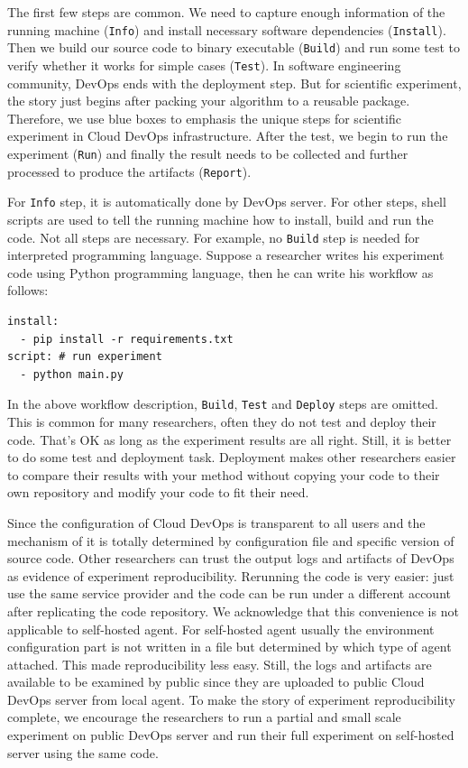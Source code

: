 \documentclass[10pt, conference, compsocconf]{IEEEtran}
\begin{document}
The first few steps are common. We need to capture enough information of the running machine (\texttt{Info}) and install necessary software dependencies (\texttt{Install}). Then we build our source code to binary executable (\texttt{Build}) and run some test to verify whether it works for simple cases (\texttt{Test}). In software engineering community, DevOps ends with the deployment step. But for scientific experiment, the story just begins after packing your algorithm to a reusable package. Therefore, we use blue boxes to emphasis the unique steps for scientific experiment in Cloud DevOps infrastructure. After the test, we begin to run the experiment (\texttt{Run}) and finally the result needs to be collected and further processed to produce the artifacts (\texttt{Report}).

For \texttt{Info} step, it is automatically done by DevOps server. For other steps, shell scripts are used to tell the running machine how to install, build and run the code. Not all steps are necessary. For example, no \texttt{Build} step is needed for interpreted programming language. Suppose a researcher writes his experiment code using Python programming language, then he can write his workflow as follows:
\begin{lstlisting}[caption={workflow description}, label={lst:wd}, basicstyle={\small}]
install: 
  - pip install -r requirements.txt
script: # run experiment
  - python main.py
\end{lstlisting}

In the above workflow description, \texttt{Build}, \texttt{Test} and \texttt{Deploy} steps are omitted. This is common for many researchers, often they do not test and deploy their code. That's OK as long as the experiment results are all right. Still, it is better to do some test and deployment task. Deployment makes other researchers easier to compare their results with your method without copying your code to their own repository and modify your code to fit their need.

Since the configuration of Cloud DevOps is transparent to all users and the mechanism of it is totally determined by configuration file and specific version of source code. Other researchers can trust the output logs and artifacts of DevOps as evidence of experiment reproducibility. Rerunning the code is very easier: just use the same service provider and the code can be run under a different account after replicating the code repository. We acknowledge that this convenience is not applicable to self-hosted agent. For self-hosted agent usually the environment configuration part is not written in a file but determined by which type of agent attached. This made reproducibility less easy. Still, the logs and artifacts are available to be examined by public since they are uploaded to public Cloud DevOps server from local agent. To make the story of experiment reproducibility complete,
we encourage the researchers to run a partial and small scale experiment on public DevOps server and run their full experiment on self-hosted server using the same code. 
\end{document}
